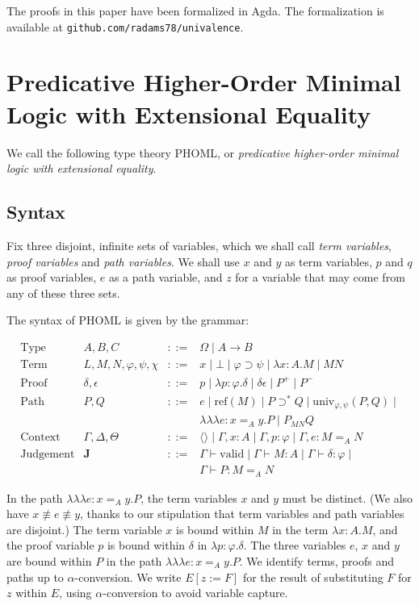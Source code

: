 \documentclass[a4paper,UKenglish]{lipics-v2016}
\newcommand*{\reff}[1]{\ensuremath{\mathrm{ref} \left( {#1} \right)}}
\newcommand*{\univ}[4]{\ensuremath{\mathrm{univ}_{{#1}, {#2}} \left({#3} , {#4} \right)}}
\newcommand*{\triplelambda}{\ensuremath{\lambda \!\! \lambda \!\! \lambda}}
\newcommand*{\vald}{\ensuremath{\vdash \mathrm{valid}}}
\theoremstyle{plain}
\theoremstyle{definition}
\begin{document}
The proofs in this paper have been formalized in Agda.  The formalization is available at \texttt{github.com/radams78/univalence}.

\section{Predicative Higher-Order Minimal Logic with Extensional Equality}

We call the following type theory PHOML, or \emph{predicative higher-order minimal logic with extensional equality}.  

\subsection{Syntax}

Fix three disjoint, infinite sets of variables, which we shall call \emph{term variables}, \emph{proof variables}
and \emph{path variables}.  We shall use $x$ and $y$ as term variables, $p$ and $q$ as proof variables,
$e$ as a path variable, and $z$ for a variable that may come from any of these three sets.

The syntax of PHOML is given by the grammar:

\[
\begin{array}{lrcl}
\text{Type} & A,B,C & ::= & \Omega \mid A \rightarrow B \\
\text{Term} & L,M,N, \varphi,\psi,\chi & ::= & x \mid \bot \mid \varphi \supset \psi \mid \lambda x:A.M \mid MN \\
\text{Proof} & \delta, \epsilon & ::= & p \mid \lambda p:\varphi.\delta \mid \delta \epsilon \mid P^+ \mid P^- \\
\text{Path} & P, Q & ::= & e \mid \reff{M} \mid P \supset^* Q \mid \univ{\varphi}{\psi}{P}{Q} \mid \\
& & & \triplelambda e : x =_A y. P \mid P_{MN} Q \\
\text{Context} & \Gamma, \Delta, \Theta & ::= & \langle \rangle \mid \Gamma, x : A \mid \Gamma, p : \varphi \mid \Gamma, e : M =_A N \\
\text{Judgement} & \mathbf{J} & ::= & \Gamma \vald \mid \Gamma \vdash M : A \mid \Gamma \vdash \delta : \varphi \mid \\
& & & \Gamma \vdash P : M =_A N
\end{array}
\]

In the path $\triplelambda e : x =_A y . P$, the term variables $x$ and $y$ must be distinct.  (We also have $x \not\equiv e \not\equiv y$, thanks to our
stipulation that term variables and path variables are disjoint.)  The term variable $x$ is bound within $M$ in the term $\lambda x:A.M$,
and the proof variable $p$ is bound within $\delta$ in $\lambda p:\varphi.\delta$.  The three variables $e$, $x$ and $y$ are bound within $P$ in the path
$\triplelambda e:x =_A y.P$.  We identify terms, proofs and paths up to $\alpha$-conversion.  We write $E[z:=F]$ for the result of substituting $F$ for $z$ within
$E$, using $\alpha$-conversion to avoid variable capture.
\end{document}
